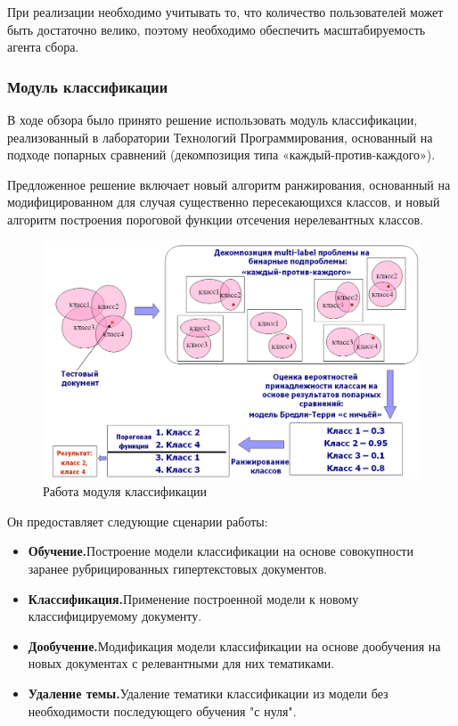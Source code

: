 \documentclass[russian, utf8, emptystyle]{eskdtext}
\begin{document}
При реализации необходимо учитывать то, что количество пользователей может быть достаточно велико, поэтому необходимо обеспечить масштабируемость агента сбора.
\subsubsection{Модуль классификации}
В ходе обзора было принято решение использовать модуль классификации, реализованный в лаборатории Технологий Программирования, основанный на подходе попарных сравнений (декомпозиция типа «каждый-против-каждого»). 

Предложенное решение включает новый алгоритм ранжирования, основанный на модифицированном для случая существенно пересекающихся классов, и новый алгоритм построения пороговой функции отсечения нерелевантных классов. 
\begin{figure}[h]
	\begin{center}
		\includegraphics[width=14cm]{pic/module.png}
		\caption{Работа модуля классификации}
		\label{fig:low_sigma}
	\end{center}
\end{figure}
Он предоставляет следующие сценарии работы:
\begin{itemize}
	\item {\bf Обучение.}Построение модели классификации на основе совокупности заранее рубрицированных гипертекстовых документов.
	
	\item {\bf Классификация.}Применение построенной модели к новому классифицируемому документу.
	\item {\bf Дообучение.}Модификация модели классификации на основе дообучения на новых документах с релевантными для них тематиками.
	\item {\bf Удаление темы.}Удаление тематики классификации из модели без необходимости последующего обучения "с нуля".
\end{itemize}
\end{document}
